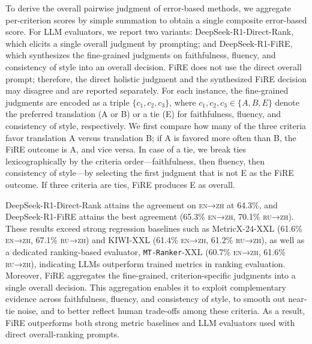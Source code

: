\documentclass{article}
\theoremstyle{plain}
\theoremstyle{definition}
\theoremstyle{remark}
\newcommand{\enzh}{\textsc{en→zh} }
\newcommand{\enzhx}{\textsc{en→zh}}
\newcommand{\ruzhx}{\textsc{ru→zh}}
\newcommand{\rankerx}{\texttt{MT-Ranker}}
\newcommand{\oursx}{FiRE}
\newcommand{\ours}{FiRE }
\begin{document}
To derive the overall pairwise judgment of error-based methods, we aggregate per-criterion scores by simple summation to obtain a single composite error-based score. For LLM evaluators, we report two variants: DeepSeek-R1-Direct-Rank, which elicits a single overall judgment by prompting; and DeepSeek-R1-\oursx, which synthesizes the fine-grained judgments on faithfulness, fluency, and consistency of style into an overall decision. \ours does not use the direct overall prompt; therefore, the direct holistic judgment and the synthesized FiRE decision may disagree and are reported separately. For each instance, the fine-grained judgments are encoded as a triple $\{c_1, c_2, c_3\}$, where $c_1, c_2, c_3 \in \{A, B, E\}$ denote the preferred translation (A or B) or a tie (E) for faithfulness, fluency, and consistency of style, respectively. We first compare how many of the three criteria favor translation A versus translation B; if A is favored more often than B, the FiRE outcome is A, and vice versa. In case of a tie, we break ties lexicographically by the criteria order—faithfulness, then fluency, then consistency of style—by selecting the first judgment that is not E as the FiRE outcome. If three criteria are ties, \ours produces E as overall.

DeepSeek-R1-Direct-Rank attains the agreement on \enzh at 64.3\%, and DeepSeek-R1-\ours attains the best agreement (65.3\% \enzhx, 70.1\% \ruzhx). These results exceed strong regression baselines such as MetricX-24-XXL (61.6\% \enzhx, 67.1\% \ruzhx) and KIWI-XXL (61.4\% \enzhx, 61.2\% \ruzhx), as well as a dedicated ranking-based evaluator, \rankerx-XXL (60.7\% \enzhx, 61.6\% \ruzhx), indicating LLMs outperform trained metrics in ranking evaluation.
Moreover, \ours aggregates the fine-grained, criterion-specific judgments into a single overall decision. This aggregation enables it to exploit complementary evidence across faithfulness, fluency, and consistency of style, to smooth out near-tie noise, and to better reflect human trade-offs among these criteria. As a result, \ours outperforms both strong metric baselines and LLM evaluators used with direct overall-ranking prompts.
\end{document}
